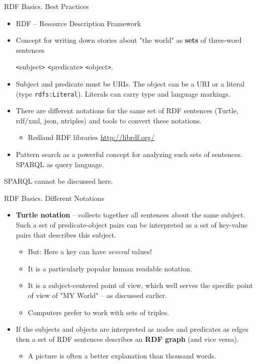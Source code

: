 \documentclass{beamer}
\def\lt{\texttt{<}}
\def\gt{\texttt{>}}
\begin{document}
\begin{frame}{RDF Basics. Best Practices}
  \begin{itemize}
  \item RDF -- Resource Description Framework
  \item Concept for writing down stories about "the world" as \textbf{sets} of
    three-word sentences
    \begin{center}
      {\lt}subject{\gt} {\lt}predicate{\gt} {\lt}object{\gt}.
    \end{center}
  \item Subject and predicate must be URIs. The object can be a URI or a
    literal (type \texttt{rdfs:Literal}). Literals can carry type and language
    markings.
  \item There are different notations for the same set of RDF sentences
    (Turtle, rdf/xml, json, ntriples) and tools to convert these notations.
    \begin{itemize}
    \item[] Redland RDF libraries \url{http://librdf.org/}
    \end{itemize}
  \item Pattern search as a powerful concept for analyzing such sets of
    sentences. SPARQL as query language.
  \end{itemize}
  SPARQL cannot be discussed here. 
\end{frame}
\begin{frame}{RDF Basics. Different Notations}
  \begin{itemize}
  \item \textbf{Turtle notation} -- collects together all sentences about the
    same subject. Such a set of predicate-object pairs can be interpreted as a
    set of key-value pairs that describes this subject.
    \begin{itemize}
    \item But: Here a key can have \emph{several} values!
    \item It is a particularly popular human readable notation.
    \item It is a subject-centered point of view, which well serves the
      specific point of view of "MY World" -- as discussed earlier.
    \item Computers prefer to work with sets of triples.
    \end{itemize}
  \item If the subjects and objects are interpreted as nodes and predicates as
    edges then a set of RDF sentences describes an \textbf{RDF graph} (and
    vice versa).
    \begin{itemize}
    \item[] A picture is often a better explanation than thousand words.
    \end{itemize}
  \end{itemize}
\end{frame}
\end{document}
